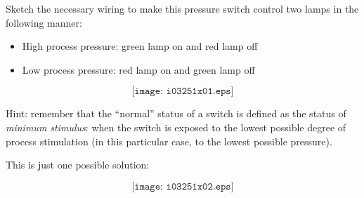 

Sketch the necessary wiring to make this pressure switch control two lamps in the following manner:

\begin{itemize}
\item{} High process pressure: green lamp on and red lamp off
\item{} Low process pressure: red lamp on and green lamp off
\end{itemize}

$$\texttt{[image: i03251x01.eps]}$$

Hint: remember that the ``normal'' status of a switch is defined as the status of {\it minimum stimulus}: when the switch is exposed to the lowest possible degree of process stimulation (in this particular case, to the lowest possible pressure).







This is just one possible solution:

$$\texttt{[image: i03251x02.eps]}$$
 










